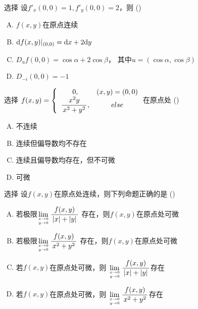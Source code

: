 
\begin{frame}{选择}
	\linespread{1.3}
	设$f'_x(0,0)=1,f'_y(0,0)=2$，则 
	(\underline{\;})
	\begin{enumerate}[(A)]
	  \item $f(x,y)$在原点连续
	  \item $\mathrm{d} f(x,y)|_{(0,0)}=\mathrm{d} x+2\mathrm{d} y$
	  \item $D_uf(0,0)=\cos\alpha+2\cos\beta$，
	  其中$u=(\cos\alpha,\cos\beta)$
	  \item $D_{-i}(0,0)=-1$
	\end{enumerate}
\end{frame}


\begin{frame}{选择}
	\linespread{1.3}
	$f(x,y)=\left\{\begin{array}{cc}
	0,& (x,y)=(0,0)\\ \displaystyle\frac{\,{x^2y}\,}{\,{x^2+y^2}\,},& else
	\end{array}\right.$在原点处
	(\underline{\;})
	\begin{enumerate}[(A)]
	  \item 不连续
	  \item 连续但偏导数均不存在
	  \item 连续且偏导数均存在，但不可微
	  \item 可微
	\end{enumerate}
\end{frame}

\begin{frame}{选择}
	\linespread{1.3}
	设$f(x,y)$在原点处连续，则下列命题正确的是
	(\underline{\;})
	\begin{enumerate}[(A)]
	  \item 若极限$\lim\limits_{x\to 0\atop y\to 0}\displaystyle\frac{\,{f(x,y)}\,}{\,{|x|+|y|}\,}$
	  存在，则$f(x,y)$在原点处可微
	  \item 若极限$\lim\limits_{x\to 0\atop y\to 0}\displaystyle\frac{\,{f(x,y)}\,}{\,{x^2+y^2}\,}$
	  存在，则$f(x,y)$在原点处可微
	  \item 若$f(x,y)$在原点处可微，则
	  $\lim\limits_{x\to 0\atop y\to 0}\displaystyle\frac{\,{f(x,y)}\,}{\,{|x|+|y|}\,}$存在
	  \item 若$f(x,y)$在原点处可微，则
	  $\lim\limits_{x\to 0\atop y\to 0}\displaystyle\frac{\,{f(x,y)}\,}{\,{x^2+y^2}\,}$存在
	\end{enumerate}
	\pause{}
\end{frame}

